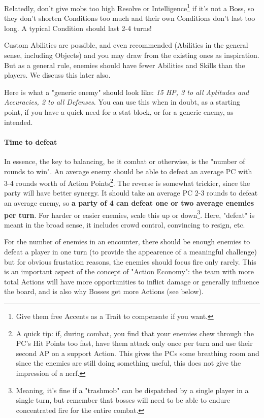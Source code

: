 Relatedly, don't give mobs too high Resolve or Intelligence\footnote{Give them free Accents as a Trait to compensate if you want.} if it's not a Boss, so they don't shorten Conditions too much and their own Conditions don't last too long. A typical Condition should last 2-4 turns!

Custom Abilities are possible, and even recommended (Abilities in the general sense, including Objects) and you may draw from the existing ones as inspiration. But as a general rule, enemies should have fewer Abilities and Skills than the players. We discuss this later also.

\begin{rpg-examplebox}
    Here is what a "generic enemy" should look like: \textit{15 HP, 3 to all Aptitudes and Accuracies, 2 to all Defenses}. You can use this when in doubt, as a starting point, if you have a quick need for a stat block, or for a generic enemy, as intended.
\end{rpg-examplebox}

\paragraph{Time to defeat}

In essence, the key to balancing, be it combat or otherwise, is the "number of rounds to win". An average enemy should be able to defeat an average PC with 3-4 rounds worth of Action Points\footnote{A quick tip: if, during combat, you find that your enemies chew through the PC's Hit Points too fast, have them attack only once per turn and use their second AP on a support Action. This gives the PCs some breathing room and since the enemies are still doing something useful, this does not give the impression of a nerf.}. The reverse is somewhat trickier, since the party will have better synergy. It should take an average PC 2-3 rounds to defeat an average enemy, so \textbf{a party of 4 can defeat one or two average enemies per turn}. For harder or easier enemies, scale this up or down\footnote{Meaning, it's fine if a "trashmob" can be dispatched by a single player in a single turn, but remember that bosses will need to be able to endure concentrated fire for the entire combat.}. Here, "defeat" is meant in the broad sense, it includes crowd control, convincing to resign, etc.

For the number of enemies in an encounter, there should be enough enemies to defeat a player in one turn (to provide the appearence of a meaningful challenge) but for obvious frustation reasons, the enemies should focus fire only rarely. This is an important aspect of the concept of "Action Economy": the team with more total Actions will have more opportunities to inflict damage or generally influence the board, and is also why Bosses get more Actions (see below).


